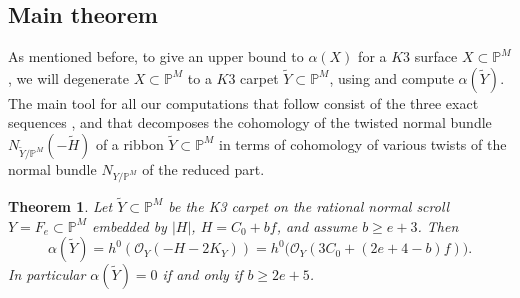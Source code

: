 \documentclass[11pt,reqno]{amsart}
\theoremstyle{plain}
\newtheorem{theorem}{Theorem}[section]
\theoremstyle{definition}
\newtheorem{remark}[theorem]{Remark}
\newcommand{\PM}{\mathbb{P}^M}
\newcommand{\OO}{\mathcal{O}}
\newcommand{\Yt}{\widetilde{Y}}
\begin{document}
\subsection{Main theorem}

As mentioned before, to give an upper bound to $\alpha(X)$ for a $K3$ surface $X \subset \mathbb{P}^M$, we will degenerate $X \subset \mathbb{P}^M$ to a $K3$ carpet $\widetilde{Y} \subset \mathbb{P}^M$, using  and compute $\alpha(\widetilde{Y})$.  The main tool for all our computations that follow consist of the three exact sequences ,  and   that decomposes the cohomology of the twisted normal bundle $N_{\widetilde{Y}/\mathbb{P}^M}(-\widetilde{H})$ of a ribbon $\widetilde{Y} \subset \mathbb{P}^M$ in terms of cohomology of various twists of the normal bundle $N_{Y/\mathbb{P}^M}$ of the reduced part. \\

\begin{theorem}\label{thm:alpha}
Let $\Yt\subset\PM$ be the K3 carpet on the rational normal scroll $Y=F_e\subset\PM$ embedded by $|H|$, $H=C_0+bf$, and assume $b\ge e+3$. Then
\[
\alpha(\Yt)=h^0(\OO_Y(-H-2K_Y))=h^0\big(\OO_Y(3C_0+(2e+4-b)f)\big).
\]
In particular $\alpha(\Yt)=0$ if and only if $b\ge 2e+5$.
\end{theorem}

\end{document}
